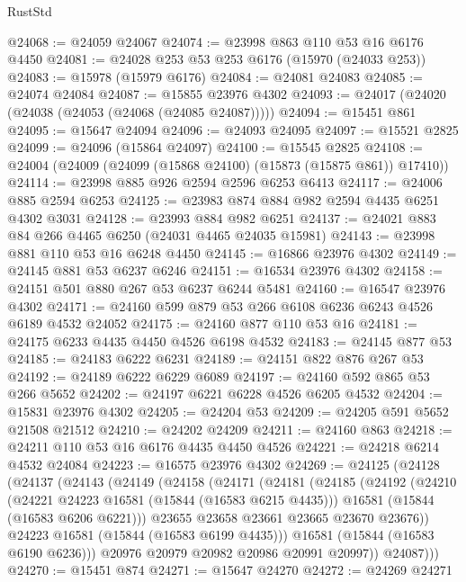 \begin{lexlean}{RustStd}
\begin{coremodule}
@24068 := @24059 @24067
@24074 := @23998 @863 @110 @53 @16 @6176 @4450
@24081 := @24028 @253 @53 @253 @6176 (@15970 (@24033 @253))
@24083 := @15978 (@15979 @6176)
@24084 := @24081 @24083
@24085 := @24074 @24084
@24087 := @15855 @23976 @4302
@24093 := @24017 (@24020 (@24038 (@24053 (@24068 (@24085 @24087)))))
@24094 := @15451 @861
@24095 := @15647 @24094
@24096 := @24093 @24095
@24097 := @15521 @2825
@24099 := @24096 (@15864 @24097)
@24100 := @15545 @2825
@24108 := @24004 (@24009 (@24099 (@15868 @24100) (@15873 (@15875 @861)) @17410))
@24114 := @23998 @885 @926 @2594 @2596 @6253 @6413
@24117 := @24006 @885 @2594 @6253
@24125 := @23983 @874 @884 @982 @2594 @4435 @6251 @4302 @3031
@24128 := @23993 @884 @982 @6251
@24137 := @24021 @883 @84 @266 @4465 @6250 (@24031 @4465 @24035 @15981)
@24143 := @23998 @881 @110 @53 @16 @6248 @4450
@24145 := @16866 @23976 @4302
@24149 := @24145 @881 @53 @6237 @6246
@24151 := @16534 @23976 @4302
@24158 := @24151 @501 @880 @267 @53 @6237 @6244 @5481
@24160 := @16547 @23976 @4302
@24171 := @24160 @599 @879 @53 @266 @6108 @6236 @6243 @4526 @6189 @4532 @24052
@24175 := @24160 @877 @110 @53 @16
@24181 := @24175 @6233 @4435 @4450 @4526 @6198 @4532
@24183 := @24145 @877 @53
@24185 := @24183 @6222 @6231
@24189 := @24151 @822 @876 @267 @53
@24192 := @24189 @6222 @6229 @6089
@24197 := @24160 @592 @865 @53 @266 @5652
@24202 := @24197 @6221 @6228 @4526 @6205 @4532
@24204 := @15831 @23976 @4302
@24205 := @24204 @53
@24209 := @24205 @591 @5652 @21508 @21512
@24210 := @24202 @24209
@24211 := @24160 @863
@24218 := @24211 @110 @53 @16 @6176 @4435 @4450 @4526
@24221 := @24218 @6214 @4532 @24084
@24223 := @16575 @23976 @4302
@24269 := @24125
    (@24128
      (@24137
        (@24143
          (@24149
            (@24158
              (@24171
                (@24181
                  (@24185
                    (@24192
                      (@24210
                        (@24221 @24223 @16581 (@15844 (@16583 @6215 @4435)))
                        @16581
                        (@15844 (@16583 @6206 @6221)))
                      @23655
                      @23658
                      @23661
                      @23665
                      @23670
                      @23676))
                  @24223
                  @16581
                  (@15844 (@16583 @6199 @4435)))
                @16581
                (@15844 (@16583 @6190 @6236)))
              @20976
              @20979
              @20982
              @20986
              @20991
              @20997))
          @24087)))
@24270 := @15451 @874
@24271 := @15647 @24270
@24272 := @24269 @24271

\end{coremodule}
\end{lexlean}
